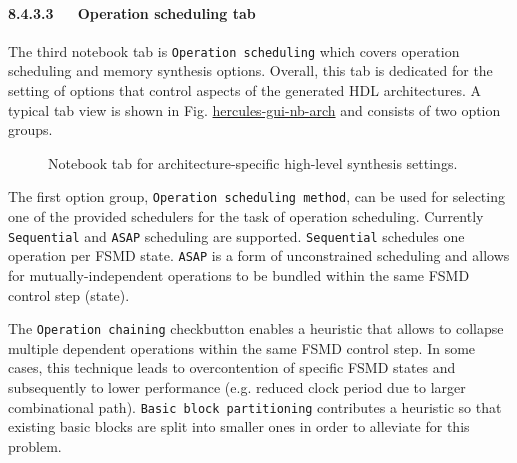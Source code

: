 \documentclass[a4paper]{article}
\begin{document}
\paragraph{8.4.3.3~~~Operation scheduling tab%
  \label{operation-scheduling-tab}%
}

The third notebook tab is \texttt{Operation scheduling} which covers operation scheduling and memory synthesis options. Overall, this tab is dedicated for the setting of options that control aspects of the generated HDL architectures. A typical tab view is shown in Fig. \hyperref[hercules-gui-nb-arch]{hercules-gui-nb-arch} and consists of two option groups.
\begin{figure}
\label{hercules-gui-nb-arch}
\noindent{}
\caption{Notebook tab for architecture-specific high-level synthesis settings.}
\end{figure}

The first option group, \texttt{Operation scheduling method}, can be used for selecting one of the provided schedulers for the task of operation scheduling. Currently \texttt{Sequential} and \texttt{ASAP} scheduling are supported. \texttt{Sequential} schedules one operation per FSMD state. \texttt{ASAP} is a form of unconstrained scheduling and allows for mutually-independent operations to be bundled within the same FSMD control step (state).

The \texttt{Operation chaining} checkbutton enables a heuristic that allows to collapse multiple dependent operations within the same FSMD control step. In some cases, this technique leads to overcontention of specific FSMD states and subsequently to lower performance (e.g. reduced clock period due to larger combinational path). \texttt{Basic block partitioning} contributes a heuristic so that existing basic blocks are split into smaller ones in order to alleviate for this problem.
\end{document}
